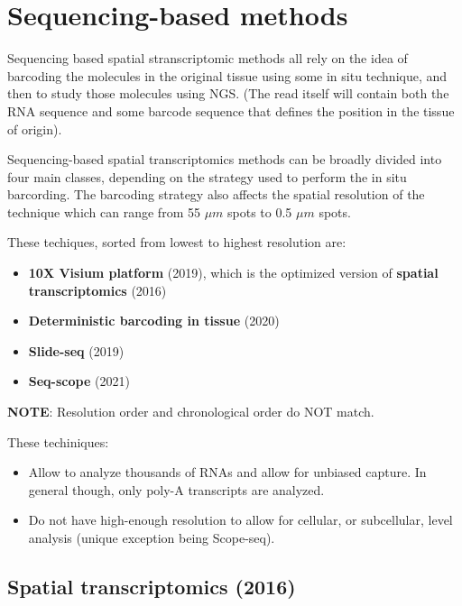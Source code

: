 \hypertarget{sequencing-based-methods}{%
\section{Sequencing-based methods}\label{sequencing-based-methods}}

Sequencing based spatial stranscriptomic methods all rely on the idea of 
barcoding the molecules in the original tissue using some in situ technique,
and then to study those molecules using NGS. (The read itself will contain
both the RNA sequence and some barcode sequence that defines the position in
the tissue of origin).

Sequencing-based spatial transcriptomics methods can be broadly divided into 
four main classes, depending on the strategy used to perform the in situ 
barcording. The barcoding strategy also affects the spatial resolution of the 
technique which can range from 55 $\mu m$ spots to 0.5 $\mu m$ spots. 

These techiques, sorted from lowest to highest resolution are:
\begin{itemize}
\tightlist
\item 
  \textbf{10X Visium platform} (2019), which is the optimized version of 
  \textbf{spatial transcriptomics} (2016)
\item
  \textbf{Deterministic barcoding in tissue} (2020)
\item 
  \textbf{Slide-seq} (2019)
\item
  \textbf{Seq-scope} (2021)
\end{itemize}

\textbf{NOTE}: Resolution order and chronological order do NOT match.

These techiniques:
\begin{itemize}
\tightlist
\item
  Allow to analyze thousands of RNAs and allow for unbiased capture. In 
  general though, only poly-A transcripts are analyzed.
\item
  Do not have high-enough resolution to allow for cellular, or subcellular,
  level analysis (unique exception being Scope-seq).
\end{itemize}

\hypertarget{spatial-transcriptomics-2016}{%
\subsection{Spatial transcriptomics
(2016)}\label{spatial-transcriptomics-2016}}

